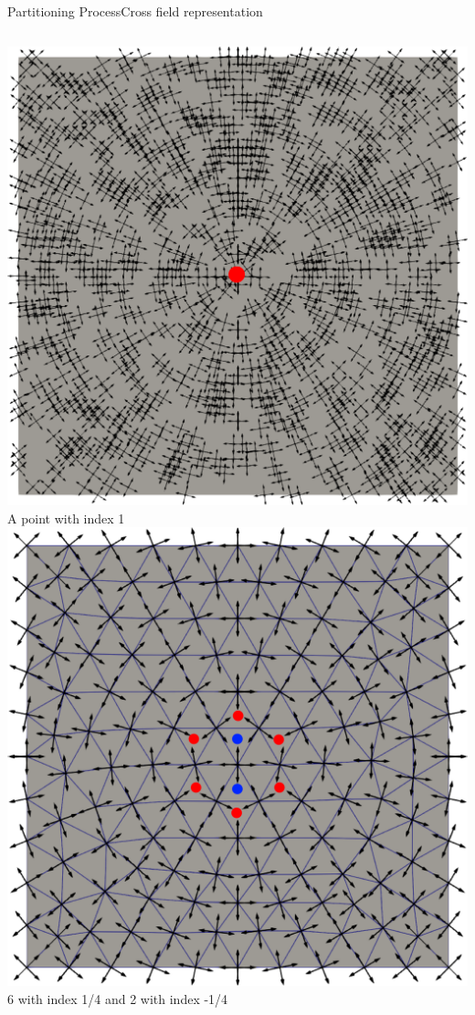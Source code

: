 \documentclass[compress,10pt,aspectratio=169]{beamer}
\begin{document}
\begin{frame}{Partitioning Process}{Cross field representation}
\begin{columns}
\begin{column}{0.2\textwidth}
\centering
\includegraphics[scale=0.09]{images/u_sing.pdf}
\scriptsize A point with index 1
\includegraphics[scale=0.09]{images/u_h_sing.pdf}
\scriptsize 6 with index 1/4 and 2 with index -1/4 \vspace{0.2cm}
\end{column}
\end{columns}
\end{frame}
\end{document}
